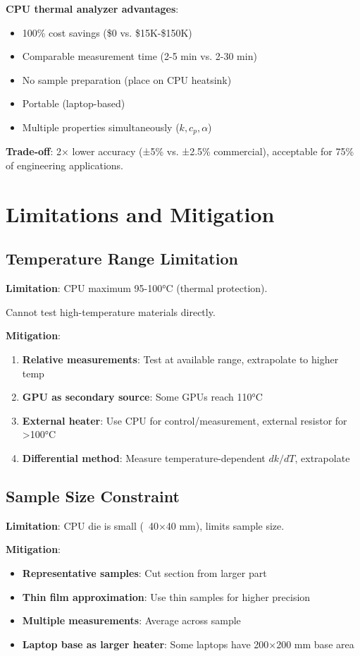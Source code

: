 \documentclass[12pt,a4paper]{article}
\begin{document}
{{\textbf{CPU thermal analyzer advantages}:
\begin{itemize}
\item 100\% cost savings (\$0 vs. \$15K-\$150K)
\item Comparable measurement time (2-5 min vs. 2-30 min)
\item No sample preparation (place on CPU heatsink)
\item Portable (laptop-based)
\item Multiple properties simultaneously ($k, c_p, \alpha$)
\end{itemize}

\textbf{Trade-off}: 2× lower accuracy (±5\% vs. ±2.5\% commercial), acceptable for 75\% of engineering applications.

\section{Limitations and Mitigation}

\subsection{Temperature Range Limitation}

\textbf{Limitation}: CPU maximum 95-100°C (thermal protection).

Cannot test high-temperature materials directly.

\textbf{Mitigation}:
\begin{enumerate}
\item \textbf{Relative measurements}: Test at available range, extrapolate to higher temp
\item \textbf{GPU as secondary source}: Some GPUs reach 110°C
\item \textbf{External heater}: Use CPU for control/measurement, external resistor for >100°C
\item \textbf{Differential method}: Measure temperature-dependent $dk/dT$, extrapolate
\end{enumerate}

\subsection{Sample Size Constraint}

\textbf{Limitation}: CPU die is small (~40×40 mm), limits sample size.

\textbf{Mitigation}:
\begin{itemize}
\item \textbf{Representative samples}: Cut section from larger part
\item \textbf{Thin film approximation}: Use thin samples for higher precision
\item \textbf{Multiple measurements}: Average across sample
\item \textbf{Laptop base as larger heater}: Some laptops have 200×200 mm base area
\end{itemize}

}}
\end{document}
